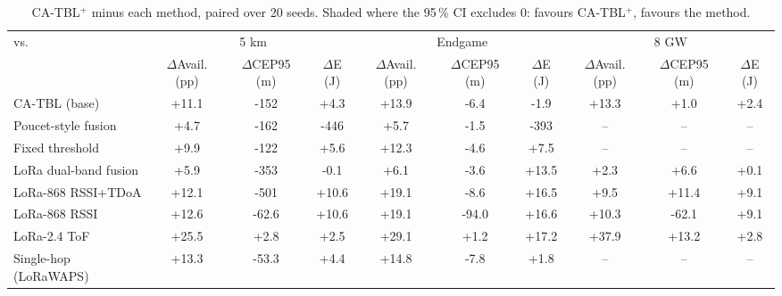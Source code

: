 \begin{table}[t]
\centering
\small
\setlength{\tabcolsep}{4.5pt}
\caption{CA-TBL$^{+}$ minus each method, paired over 20 seeds. Shaded where the 95\,\% CI excludes 0: \colorbox{fav}{favours CA-TBL$^{+}$}, \colorbox{unf}{favours the method}.}
\label{tab:paired}
\begin{tabular}{lccccccccc}
\toprule
vs. & \multicolumn{3}{c}{5 km} & \multicolumn{3}{c}{Endgame} & \multicolumn{3}{c}{8 GW} \\
\cmidrule(lr){2-4}\cmidrule(lr){5-7}\cmidrule(lr){8-10}
 & $\Delta$Avail. (pp) & $\Delta$CEP95 (m) & $\Delta$E (J) & $\Delta$Avail. (pp) & $\Delta$CEP95 (m) & $\Delta$E (J) & $\Delta$Avail. (pp) & $\Delta$CEP95 (m) & $\Delta$E (J) \\
\midrule
CA-TBL (base) & \cellcolor{fav}+11.1 & \cellcolor{fav}-152 & \cellcolor{unf}+4.3 & \cellcolor{fav}+13.9 & \cellcolor{fav}-6.4 & -1.9 & \cellcolor{fav}+13.3 & +1.0 & \cellcolor{unf}+2.4 \\
Poucet-style fusion & \cellcolor{fav}+4.7 & \cellcolor{fav}-162 & \cellcolor{fav}-446 & \cellcolor{fav}+5.7 & -1.5 & \cellcolor{fav}-393 & -- & -- & -- \\
Fixed threshold & \cellcolor{fav}+9.9 & \cellcolor{fav}-122 & \cellcolor{unf}+5.6 & \cellcolor{fav}+12.3 & \cellcolor{fav}-4.6 & \cellcolor{unf}+7.5 & -- & -- & -- \\
LoRa dual-band fusion & \cellcolor{fav}+5.9 & \cellcolor{fav}-353 & -0.1 & \cellcolor{fav}+6.1 & \cellcolor{fav}-3.6 & \cellcolor{unf}+13.5 & \cellcolor{fav}+2.3 & +6.6 & +0.1 \\
LoRa-868 RSSI+TDoA & \cellcolor{fav}+12.1 & \cellcolor{fav}-501 & \cellcolor{unf}+10.6 & \cellcolor{fav}+19.1 & \cellcolor{fav}-8.6 & \cellcolor{unf}+16.5 & \cellcolor{fav}+9.5 & \cellcolor{unf}+11.4 & \cellcolor{unf}+9.1 \\
LoRa-868 RSSI & \cellcolor{fav}+12.6 & \cellcolor{fav}-62.6 & \cellcolor{unf}+10.6 & \cellcolor{fav}+19.1 & \cellcolor{fav}-94.0 & \cellcolor{unf}+16.6 & \cellcolor{fav}+10.3 & \cellcolor{fav}-62.1 & \cellcolor{unf}+9.1 \\
LoRa-2.4 ToF & \cellcolor{fav}+25.5 & +2.8 & \cellcolor{unf}+2.5 & \cellcolor{fav}+29.1 & +1.2 & \cellcolor{unf}+17.2 & \cellcolor{fav}+37.9 & \cellcolor{unf}+13.2 & \cellcolor{unf}+2.8 \\
Single-hop (LoRaWAPS) & \cellcolor{fav}+13.3 & \cellcolor{fav}-53.3 & \cellcolor{unf}+4.4 & \cellcolor{fav}+14.8 & \cellcolor{fav}-7.8 & +1.8 & -- & -- & -- \\
\bottomrule
\end{tabular}
\end{table}

